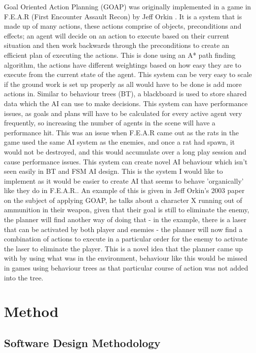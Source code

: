 \documentclass[12pt]{report}
\begin{document}
Goal Oriented Action Planning (GOAP) was originally implemented in a game in F.E.A.R (First Encounter Assault Recon) by Jeff Orkin \cite{goap}. It is a system that is made up of many actions, these actions comprise of objects, preconditions and effects; an agent will decide on an action to execute based on their current situation and then work backwards through the preconditions to create an efficient plan of executing the actions. This is done using an A* path finding algorithm, the actions have different weightings based on how easy they are to execute from the current state of the agent. This system can be very easy to scale if the ground work is set up properly as all would have to be done is add more actions in. Similar to behaviour trees (BT), a blackboard is used to store shared data which the AI can use to make decisions. This system can have performance issues, as goals and plans will have to be calculated for every active agent very frequently, so increasing the number of agents in the scene will have a performance hit. This was an issue when F.E.A.R came out as the rats in the game used the same AI system as the enemies, and once a rat had spawn, it would not be destroyed, and this would accumulate over a long play session and cause performance issues. This system can create novel AI behaviour which isn't seen easily in BT and FSM AI design. This is the system I would like to implement as it would be easier to create AI that seems to behave 'organically' like they do in F.E.A.R.. \cite{goapTommyTompson} An example of this is given in Jeff Orkin's 2003 paper on the subject of applying GOAP\cite{applyingGoap}, he talks about a character X running out of ammunition in their weapon, given that their goal is still to eliminate the enemy, the planner will find another way of doing that - in the example, there is a laser that can be activated by both player and enemies - the planner will now find a combination of actions to execute in a particular order for the enemy to activate the laser to eliminate the player. This is a novel idea that the planner came up with by using what was in the environment, behaviour like this would be missed in games using behaviour trees as that particular course of action was not added into the tree.

\chapter{Method}
\section{Software Design Methodology}
\end{document}
